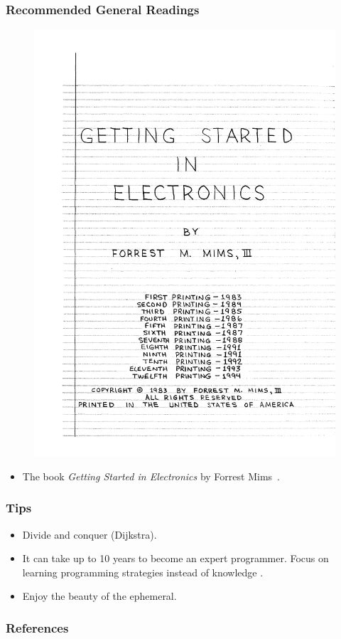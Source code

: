 \documentclass[screen, aspectratio=169]{beamer}
\begin{document}
\begin{frame}
\frametitle{Recommended General Readings}
\begin{figure}
\includegraphics[scale=0.2]{img/gettingstartedelectronics-book.pdf}
\end{figure}
\begin{itemize}
\item The book \emph{Getting Started in Electronics} by Forrest Mims~\cite{Mims.1983.radioshack}.
\end{itemize}
\end{frame}
%
\begin{frame}
\frametitle{Tips}
\begin{itemize}
\item Divide and conquer (Dijkstra).
\item It can take up to 10 years to become an expert programmer. Focus on learning programming strategies instead of knowledge \cite{Robins.2003.learning}.
\item Enjoy the beauty of the ephemeral.
\end{itemize}
\end{frame}
%
\begin{frame}
  \frametitle{References}
  \printbibliography
\end{frame}
%
\end{document}
